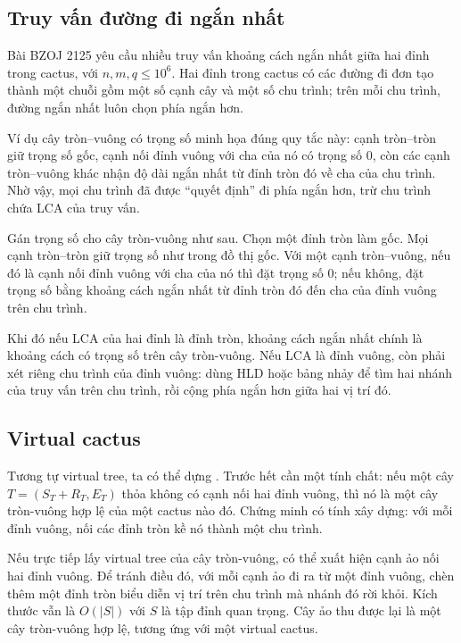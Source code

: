 \documentclass[11pt]{article}
\newcommand{\ET}{E_T}
\newcommand{\RT}{R_T}
\newcommand{\ST}{S_T}
\begin{document}
\subsection{Truy vấn đường đi ngắn nhất}

Bài BZOJ 2125 yêu cầu nhiều truy vấn khoảng cách ngắn nhất giữa hai đỉnh trong
cactus, với \(n,m,q\le 10^6\). Hai đỉnh trong cactus có các đường đi đơn tạo
thành một chuỗi gồm một số cạnh cây và một số chu trình; trên mỗi chu trình,
đường ngắn nhất luôn chọn phía ngắn hơn.

Ví dụ cây tròn--vuông có trọng số minh họa đúng quy tắc này: cạnh tròn--tròn
giữ trọng số gốc, cạnh nối đỉnh
vuông với cha của nó có trọng số \(0\), còn các cạnh tròn--vuông khác nhận độ
dài ngắn nhất từ đỉnh tròn đó về cha của chu trình. Nhờ vậy, mọi chu trình đã
được ``quyết định'' đi phía ngắn hơn, trừ chu trình chứa LCA của truy vấn.

Gán trọng số cho cây tròn-vuông như sau. Chọn một đỉnh tròn làm gốc. Mọi cạnh
tròn--tròn giữ trọng số như trong đồ thị gốc. Với một cạnh tròn--vuông, nếu đó
là cạnh nối đỉnh vuông với cha của nó thì đặt trọng số \(0\); nếu không, đặt
trọng số bằng khoảng cách ngắn nhất từ đỉnh tròn đó đến cha của đỉnh vuông
trên chu trình.

Khi đó nếu LCA của hai đỉnh là đỉnh tròn, khoảng cách ngắn nhất chính là khoảng
cách có trọng số trên cây tròn-vuông. Nếu LCA là đỉnh vuông, còn phải xét riêng
chu trình của đỉnh vuông: dùng HLD hoặc bảng nhảy để tìm hai nhánh của truy
vấn trên chu trình, rồi cộng phía ngắn hơn giữa hai vị trí đó.

\subsection{Virtual cactus}

Tương tự virtual tree, ta có thể dựng . Trước hết cần một
tính chất: nếu một cây \(T=(\ST+\RT,\ET)\) thỏa không có cạnh nối hai đỉnh
vuông, thì nó là một cây tròn-vuông hợp lệ của một cactus nào đó. Chứng minh
có tính xây dựng: với mỗi đỉnh vuông, nối các đỉnh tròn kề nó thành một chu
trình.

Nếu trực tiếp lấy virtual tree của cây tròn-vuông, có thể xuất hiện cạnh ảo
nối hai đỉnh vuông. Để tránh điều đó, với mỗi cạnh ảo đi ra từ một đỉnh vuông,
chèn thêm một đỉnh tròn biểu diễn vị trí trên chu trình mà nhánh đó rời khỏi.
Kích thước vẫn là \(O(|S|)\) với \(S\) là tập đỉnh quan trọng. Cây ảo thu được
lại là một cây tròn-vuông hợp lệ, tương ứng với một virtual cactus.
\end{document}
